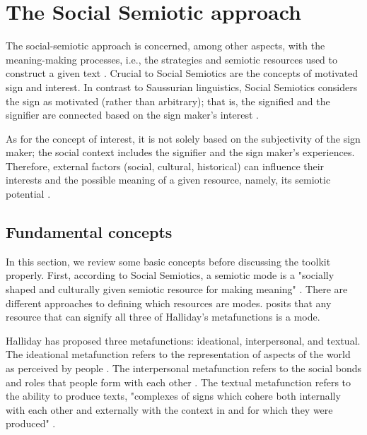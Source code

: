 \documentclass[english]{textolivre}
\begin{document}
\section{The Social Semiotic approach}\label{sec-normas}
The social-semiotic approach \cite{hodge_social_1988,van_leeuwen_introducing_2005} is concerned, among other aspects, with the meaning-making processes, i.e., the strategies and semiotic resources used to construct a given text \cites[p. 160]{jewitt_introducing_2016}. Crucial to Social Semiotics are the concepts of motivated sign and interest. In contrast to Saussurian linguistics, Social Semiotics considers the sign as motivated (rather than arbitrary); that is, the signified and the signifier are connected based on the sign maker's interest \cites[p. 157]{jewitt_introducing_2016}.

As for the concept of interest, it is not solely based on the subjectivity of the sign maker; the social context includes the signifier and the sign maker's experiences. Therefore, external factors (social, cultural, historical) can influence their interests \cites[p. 156-7]{jewitt_introducing_2016} and the possible meaning of a given resource, namely, its semiotic potential \cite[p. 4]{van_leeuwen_introducing_2005}.

\subsection{Fundamental concepts}\label{sec-conduta}
In this section, we review some basic concepts before discussing the toolkit properly. First, according to Social Semiotics, a semiotic mode is a "socially shaped and culturally given semiotic resource for making meaning" \cite[p.~79]{kress_multimodality:_2010}. There are different approaches to defining which resources are modes. \textcite[p. 87]{kress_multimodality:_2010} posits that any resource that can signify all three of Halliday's metafunctions is a mode.

Halliday has proposed three metafunctions: ideational, interpersonal, and textual. The ideational metafunction refers to the representation of aspects of the world as perceived by people \cites[p. 16]{kress_reading_2020}. The interpersonal metafunction refers to the social bonds and roles that people form with each other \cites[p. 17]{kress_reading_2020}. The textual metafunction refers to the ability to produce texts, "complexes of signs which cohere both internally with each other and externally with the context in and for which they were produced" \cites[p. 17-8]{kress_reading_2020}.
\end{document}
